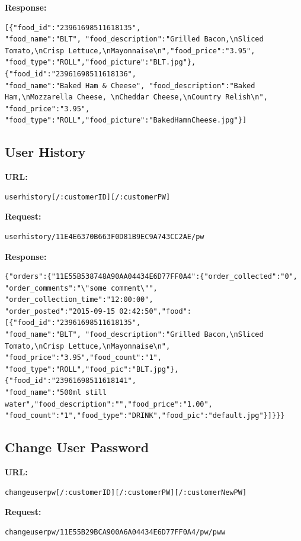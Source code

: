 \textbf{Response:}
\begin{verbatim}
[{"food_id":"23961698511618135",
"food_name":"BLT", "food_description":"Grilled Bacon,\nSliced Tomato,\nCrisp Lettuce,\nMayonnaise\n","food_price":"3.95",
"food_type":"ROLL","food_picture":"BLT.jpg"}, {"food_id":"23961698511618136",
"food_name":"Baked Ham & Cheese", "food_description":"Baked Ham,\nMozzarella Cheese, \nCheddar Cheese,\nCountry Relish\n",
"food_price":"3.95", "food_type":"ROLL","food_picture":"BakedHamnCheese.jpg"}]
\end{verbatim}

\subsection*{User History}
\textbf{URL:}
\begin{verbatim}
userhistory[/:customerID][/:customerPW]
\end{verbatim}

\textbf{Request:}
\begin{verbatim}
userhistory/11E4E6370B663F0D81B9EC9A743CC2AE/pw
\end{verbatim}

\textbf{Response:}
\begin{verbatim}
{"orders":{"11E55B538748A90AA04434E6D77FF0A4":{"order_collected":"0",
"order_comments":"\"some comment\"", "order_collection_time":"12:00:00",
"order_posted":"2015-09-15 02:42:50","food":[{"food_id":"23961698511618135",
"food_name":"BLT", "food_description":"Grilled Bacon,\nSliced Tomato,\nCrisp Lettuce,\nMayonnaise\n",
"food_price":"3.95","food_count":"1", "food_type":"ROLL","food_pic":"BLT.jpg"},{"food_id":"23961698511618141",
"food_name":"500ml still water","food_description":"","food_price":"1.00", "food_count":"1","food_type":"DRINK","food_pic":"default.jpg"}]}}}
\end{verbatim}

\subsection*{Change User Password}
\textbf{URL:}
\begin{verbatim}
changeuserpw[/:customerID][/:customerPW][/:customerNewPW]
\end{verbatim}

\textbf{Request:}
\begin{verbatim}
changeuserpw/11E55B29BCA900A6A04434E6D77FF0A4/pw/pww
\end{verbatim}

